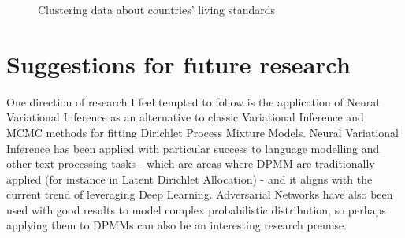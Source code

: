 \documentclass[11pt]{article}
\begin{document}
\begin{figure}[H]
	\centering
	\caption{Clustering data about countries' living standards}
\end{figure}
	
\section{Suggestions for future research}\label{proposals-for-future-research}
	
One direction of research I feel tempted to follow is the application of
Neural Variational Inference as an alternative to classic Variational
Inference and MCMC methods for fitting Dirichlet Process Mixture Models.
Neural Variational Inference has been applied with particular success to
language modelling and other text processing tasks - which are areas
where DPMM are traditionally applied (for instance in Latent Dirichlet
Allocation) - and it aligns with the current trend of leveraging Deep
Learning. Adversarial Networks have also been used with good results to
model complex probabilistic distribution, so perhaps applying them to
DPMMs can also be an interesting research premise.
	
\end{document}
